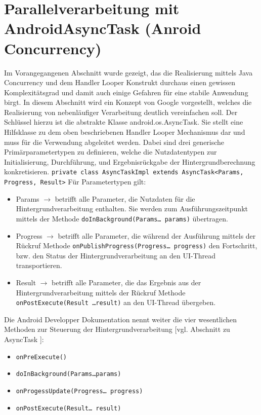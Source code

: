 \documentclass[12pt,oneside,a4paper,bibtotoc,liststotoc]{scrreprt}
\begin{document}
\section{Parallelverarbeitung mit AndroidAsyncTask (Anroid Concurrency)}
Im Vorangegangenen Abschnitt wurde gezeigt, das die Realisierung mittels Java Concurrency und dem Handler Looper Konstrukt durchaus einen gewissen Komplexitätsgrad und damit auch einige Gefahren für eine stabile Anwendung birgt. In diesem Abschnitt wird ein Konzept von Google vorgestellt, welches die Realisierung von nebenläufiger Verarbeitung deutlich vereinfachen soll. Der Schlüssel hierzu ist die abstrakte Klasse android.os.AsyncTask. Sie stellt eine Hilfsklasse zu dem oben beschriebenen Handler Looper Mechanismus dar und muss für die Verwendung abgeleitet werden. Dabei sind drei generische Primärparametertypen zu definieren, welche die  Nutzdatentypen zur Initialisierung, Durchführung, und Ergebnisrückgabe der Hintergrundberechnung konkretisieren.\newline
\newline
\texttt{private class AsyncTaskImpl extends AsyncTask<Params, Progress, Result>}
\newline
Für Parametertypen gilt:
\begin{itemize}
\item Params $\rightarrow$ betrifft alle Parameter, die Nutzdaten für die Hintergrundverarbeitung enthalten. Sie werden zum Ausführungszeitpunkt mittels der Methode \texttt{doInBackground(Params… params)} übertragen.
\item Progress $\rightarrow$ betrifft alle Parameter, die während der Ausführung mittels der Rückruf Methode \texttt{onPublishProgress(Progress… progress)} den Fortschritt, bzw.  den Status der Hintergrundverarbeitung an den UI-Thread transportieren.
\item Result $\rightarrow$ betrifft alle Parameter, die das Ergebnis aus der Hintergrundverarbeitung mittels der Rückruf Methode \texttt{onPostExecute(Result …result)} an den UI-Thread übergeben.
\end{itemize}
Die Android Developper Dokumentation nennt weiter die vier wesentlichen Methoden zur Steuerung der Hintergrundverarbeitung [vgl. Abschnitt zu AsyncTask \citet{androidDevDocu}]:
\begin{itemize}
\item \texttt{onPreExecute()}
\item \texttt{doInBackground(Params…params)}
\item \texttt{onProgessUpdate(Progress… progress)}
\item \texttt{onPostExecute(Result… result)}
\end{itemize}
\end{document}
